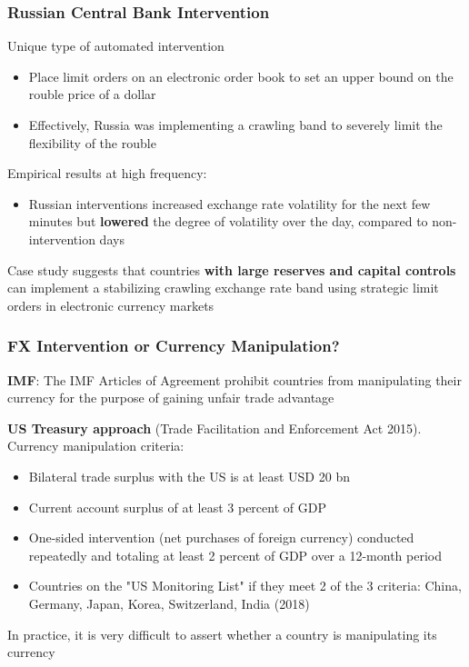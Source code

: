\documentclass{beamer}
\newenvironment{wideitemize}{\itemize\addtolength{\itemsep}{10pt}}{\enditemize}
\begin{document}
\begin{frame}
  \frametitle{Russian Central Bank Intervention}
  \begin{wideitemize}
  \item Unique type of automated intervention
    \begin{itemize}
    \item Place limit orders on an electronic order book to set an upper bound on the rouble price of a dollar
    \item Effectively, Russia was implementing a crawling band to severely limit the flexibility of the rouble
    \end{itemize}
  \item Empirical results \href{https://www.sciencedirect.com/science/article/abs/pii/S0022199609000890}{} at high frequency:
    \begin{itemize}
    \item Russian interventions increased exchange rate volatility for the next few minutes but \textbf{lowered} the degree of volatility over the day, compared to non-intervention days
    \end{itemize}
      \item Case study suggests that countries \textbf{with large reserves and capital controls} can implement a stabilizing crawling exchange rate band using strategic limit orders in electronic currency markets
  \end{wideitemize}
\end{frame}

\begin{frame}
  \frametitle{FX Intervention or Currency Manipulation?}
  \begin{wideitemize}
    \item \textbf{IMF}: The IMF Articles of Agreement prohibit countries from manipulating their currency for the purpose of gaining unfair trade advantage
    \item \textbf{US Treasury approach} (Trade Facilitation and Enforcement Act 2015). Currency manipulation criteria:
      \begin{itemize}
      \item Bilateral trade surplus with the US is at least USD 20 bn
      \item Current account surplus of at least 3 percent of GDP
      \item One-sided intervention (net purchases of foreign currency) conducted repeatedly and totaling at least 2 percent of GDP over a 12-month period
      \item Countries on the "US Monitoring List" if they meet 2 of the 3 criteria: China, Germany, Japan, Korea, Switzerland, India (2018)
      \end{itemize}
  \item In practice, it is very difficult to assert whether a country is manipulating its currency
  \end{wideitemize}  
\end{frame}
\end{document}

